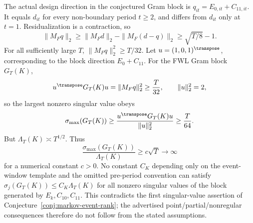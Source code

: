 The actual design direction in the conjectured Gram block is \(q_{it}=E_{0,it}+C_{11,it}\).
It equals \(d_{it}\) for every non-boundary period \(t\ge2\), and differs from \(d_{it}\) only at \(t=1\).
Residualization is a contraction, so
\[
\|M_F q\|_2
\ge
\|M_F d\|_2-\|M_F(d-q)\|_2
\ge
\sqrt{T/8}-1.
\]
For all sufficiently large \(T\), \(\|M_F q\|_2^2\ge T/32\).
Let \(u=(1,0,1)^\transpose\), corresponding to the block direction \(E_0+C_{11}\).
For the FWL Gram block \(G_T(K)\),
\[
u^\transpose G_T(K)u=\|M_F q\|_2^2\ge \frac{T}{32},
\qquad
\|u\|_2^2=2,
\]
so the largest nonzero singular value obeys
\[
\sigma_{\max}(G_T(K))\ge \frac{u^\transpose G_T(K)u}{\|u\|_2^2}\ge \frac{T}{64}.
\]
But \(\Lambda_T(K)\asymp T^{1/2}\).
Thus
\[
\frac{\sigma_{\max}(G_T(K))}{\Lambda_T(K)}
\ge c\sqrt T\to\infty
\]
for a numerical constant \(c>0\).
No constant \(C_K\) depending only on the event-window template and the omitted pre-period convention can satisfy \(\sigma_j(G_T(K))\le C_K\Lambda_T(K)\) for all nonzero singular values of the block generated by \(E_k,C_{10},C_{11}\).
This contradicts the first singular-value assertion of Conjecture~\ref{conj:markov-event-rank}; the advertised point/partial/nonregular consequences therefore do not follow from the stated assumptions.
